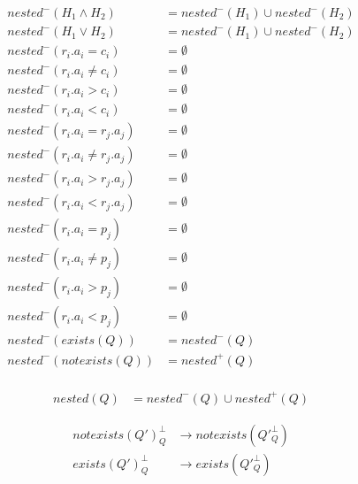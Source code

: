 \begin{mydef}
	\begin{align*}
		nested^-(H_1\land H_2) & =nested^-(H_1) \cup nested^-(H_2) \\
		nested^-(H_1\lor H_2) & =  nested^-(H_1) \cup nested^-(H_2) \\
		nested^-(r_i.a_i = c_i) & = \emptyset \\
		nested^-(r_i.a_i \neq c_i) & = \emptyset \\
		nested^-(r_i.a_i > c_i) & = \emptyset \\
		nested^-(r_i.a_i < c_i) & = \emptyset \\
		nested^-(r_i.a_i = r_j.a_j) & = \emptyset \\
		nested^-(r_i.a_i \neq r_j.a_j) & = \emptyset \\
		nested^-(r_i.a_i > r_j.a_j) & = \emptyset \\
		nested^-(r_i.a_i < r_j.a_j) & = \emptyset \\
		nested^-(r_i.a_i = p_j) & = \emptyset \\
		nested^-(r_i.a_i \neq p_j) & = \emptyset \\
		nested^-(r_i.a_i > p_j) & = \emptyset \\
		nested^-(r_i.a_i < p_j) & = \emptyset \\
		nested^-(exists(Q)) & =nested^-(Q) \\
		nested^-(notexists(Q)) & = nested^+(Q) \\
	\end{align*}
	
	\begin{align*}
		nested(Q) & = nested^-(Q) \cup nested^+(Q)
	\end{align*}
\end{mydef}

\begin{mydef}
	\begin{align*}
		notexists(Q')^\bot_Q & \rightarrow notexists(Q'^\bot_Q)
		\\exists(Q')^\bot_Q & \rightarrow exists(Q'^\bot_Q)
	\end{align*}
\end{mydef}


